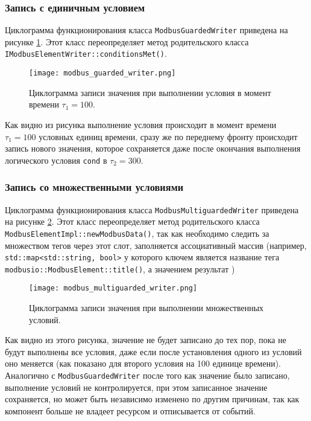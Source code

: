 \subsubsection{Запись с единичным условием}
Циклограмма функционирования класса \texttt{ModbusGuardedWriter} приведена на рисунке \ref{fig:modbus_guarded_writed}.
Этот класс переопределяет метод родительского класса \texttt{IModbusElementWriter::conditionsMet()}.
\begin{center}
    \begin{figure}[h!]
        \texttt{[image: modbus\_guarded\_writer.png]}
        \caption{Циклограмма записи значения при выполнении условия в момент времени $\tau_1=100$.}\label{fig:modbus_guarded_writed}
    \end{figure}
\end{center}
Как видно из рисунка выполнение условия происходит в момент времени $\tau_1=100$ условных единиц времени,
сразу же по переднему фронту происходит запись нового значения, которое сохраняется даже после окончания
выполнения логического условия \texttt{cond} в $\tau_2=300$.


\subsubsection{Запись со множественными условиями}
Циклограмма функционирования класса \texttt{ModbusMultiguardedWriter} приведена на рисунке \ref{fig:modbus_multiguarded_writed}.
Этот класс переопределяет метод родительского класса \texttt{ModbusElementImpl::newModbusData()},
так как необходимо следить за множеством тегов через этот слот,
заполняется ассоциативный массив (например, \texttt{std::map<std::string, bool>} у которого ключем является
название тега \texttt{modbusio::ModbusElement::title()}, а значением результат )
\begin{center}
    \begin{figure}[h!]
        \texttt{[image: modbus\_multiguarded\_writer.png]}
        \caption{Циклограмма записи значения при выполнении множественных условий.}\label{fig:modbus_multiguarded_writed}
    \end{figure}
\end{center}
Как видно из этого рисунка, значение не будет записано до тех пор, пока не будут
выполнены все условия, даже если после установления одного из условий оно меняется
(как показано для второго условия на 100 единице времени). Аналогично с \texttt{ModbusGuardedWriter}
после того как значение было записано, выполнение условий не контролируется, 
при этом записанное значение сохраняется, но может быть независимо изменено по другим причинам,
так как компонент больше не владеет ресурсом и отписывается от событий.


